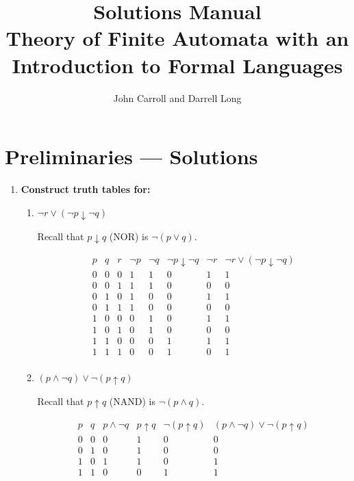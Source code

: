 \documentclass[11pt,openany]{book}
\title{Solutions Manual\\
\large Theory of Finite Automata with an Introduction to Formal Languages}
\author{John Carroll and Darrell Long}
\begin{document}
\maketitle
\tableofcontents




\iffalse
\chapter{Preliminaries --- Solutions}

\begin{enumerate}[{0.}1. ]

\item \textbf{Construct truth tables for:}

\begin{enumerate}
\item $\neg r \vee (\neg p \downarrow \neg q)$

Recall that $p \downarrow q$ (NOR) is $\neg(p \vee q)$.

\[
\begin{array}{ccc|cc|cc|c}
p & q & r & \neg p & \neg q & \neg p \downarrow \neg q & \neg r & \neg r \vee (\neg p \downarrow \neg q)\\
\hline
0 & 0 & 0 & 1 & 1 & 0 & 1 & 1\\
0 & 0 & 1 & 1 & 1 & 0 & 0 & 0\\
0 & 1 & 0 & 1 & 0 & 0 & 1 & 1\\
0 & 1 & 1 & 1 & 0 & 0 & 0 & 0\\
1 & 0 & 0 & 0 & 1 & 0 & 1 & 1\\
1 & 0 & 1 & 0 & 1 & 0 & 0 & 0\\
1 & 1 & 0 & 0 & 0 & 1 & 1 & 1\\
1 & 1 & 1 & 0 & 0 & 1 & 0 & 1\\
\end{array}
\]

\item $(p \wedge \neg q) \vee \neg(p \uparrow q)$

Recall that $p \uparrow q$ (NAND) is $\neg(p \wedge q)$.

\[
\begin{array}{cc|c|c|c|c}
p & q & p \wedge \neg q & p \uparrow q & \neg(p \uparrow q) & (p \wedge \neg q)\vee\neg(p\uparrow q)\\
\hline
0 & 0 & 0 & 1 & 0 & 0\\
0 & 1 & 0 & 1 & 0 & 0\\
1 & 0 & 1 & 1 & 0 & 1\\
1 & 1 & 0 & 0 & 1 & 1\\
\end{array}
\]
\end{enumerate}


\end{enumerate}
\end{document}
